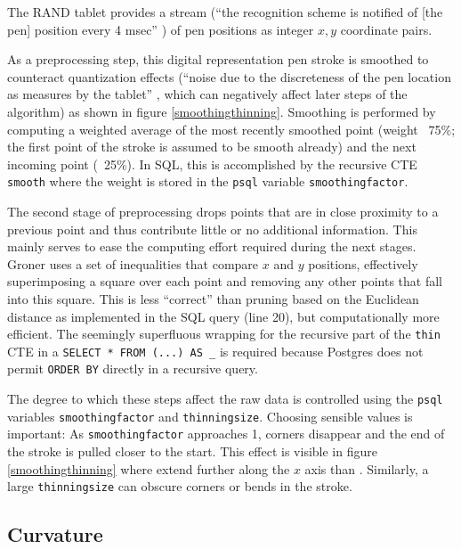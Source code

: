 \documentclass[sigconf]{acmart}
\begin{document}
The RAND tablet provides a stream (\enquote{the recognition scheme is notified of [the pen] position every 4 msec} \cite{groner}) of pen positions as integer $x,y$ coordinate pairs.

As a preprocessing step, this digital representation pen stroke is smoothed to counteract quantization effects (\enquote{noise due to the discreteness of the pen location as measures by the tablet} \cite{groner}, which can negatively affect later steps of the algorithm) as shown in figure \ref{smoothingthinning}. Smoothing is performed by computing a weighted average of the most recently smoothed point (weight ~75\%; the first point of the stroke is assumed to be smooth already) and the next incoming point (~25\%). In SQL, this is accomplished by the recursive CTE \texttt{smooth} where the weight is stored in the \texttt{psql} variable \texttt{smoothingfactor}.

The second stage of preprocessing drops points that are in close proximity to a previous point and thus contribute little or no additional information. This mainly serves to ease the computing effort required during the next stages. Groner uses a set of inequalities that compare $x$ and $y$ positions, effectively superimposing a square over each point and removing any other points that fall into this square. This is less \enquote{correct} than pruning based on the Euclidean distance as implemented in the SQL query (line 20), but computationally more efficient. The seemingly superfluous wrapping for the recursive part of the \texttt{thin} CTE in a \texttt{SELECT * FROM (...) AS \_} is required because Postgres does not permit \texttt{ORDER BY} directly in a recursive query.

The degree to which these steps affect the raw data is controlled using the \texttt{psql} variables \texttt{smoothingfactor} and \texttt{thinningsize}. Choosing sensible values is important: As \texttt{smoothingfactor} approaches 1, corners disappear and the end of the stroke is pulled closer to the start. This effect is visible in figure \ref{smoothingthinning} where {\color[HTML]{BE7777}\huge\textbullet}{\color[HTML]{52B1C6}\huge\textbullet} extend further along the $x$ axis than {\color[HTML]{777777}\huge\textbullet}{\color[HTML]{74C974}\huge\textbullet}. Similarly, a large \texttt{thinningsize} can obscure corners or bends in the stroke.

\subsection{Curvature}
\end{document}
